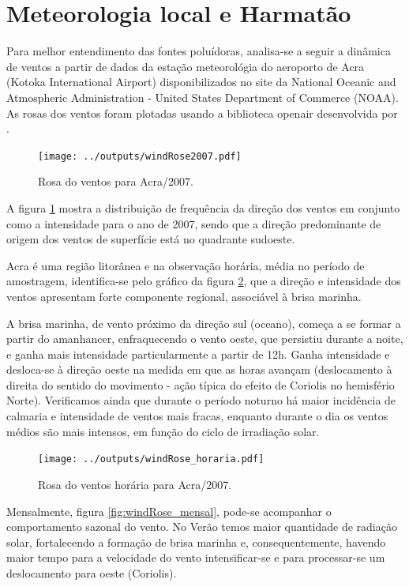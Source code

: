 \newpage
\section{Meteorologia local e Harmatão}

Para melhor entendimento das fontes poluídoras, analisa-se a seguir a 
dinâmica de ventos a partir de dados da estação meteorológia do 
aeroporto de Acra (Kotoka International Airport) disponibilizados no site da 
National Oceanic and Atmospheric Administration - United States Department of 
Commerce (NOAA). As rosas dos ventos foram plotadas usando a biblioteca 
openair desenvolvida por \citet{carslaw2012}.

\begin{figure}[H]
  \centering
  \texttt{[image: ../outputs/windRose2007.pdf]}
  \caption{Rosa do ventos para Acra/2007. \label{fg:rosaCompleta}}
\end{figure}

A figura \ref{fg:rosaCompleta} mostra a distribuição de frequência da direção 
dos ventos em conjunto como a intensidade para o ano de 2007, sendo que a direção 
predominante de origem dos ventos de superfície está no quadrante sudoeste.

Acra é uma região litorânea e na observação horária, média no período de 
amostragem, identifica-se pelo gráfico da figura \ref{fig:windRose_horaria}, 
que a direção e intensidade dos ventos apresentam forte componente regional, 
associável à brisa marinha.

A brisa marinha, de vento próximo da direção sul (oceano), começa a se formar a 
partir do amanhancer, enfraquecendo o vento oeste, que persistiu durante a noite,
e ganha mais intensidade particularmente a partir de 12h. Ganha intensidade e 
desloca-se à direção oeste na medida em que as horas avançam 
(deslocamento à direita do sentido do movimento - ação típica do efeito de 
Coriolis no hemisfério Norte). 
Verificamos ainda que durante o período noturno há maior incidência de calmaria
e intensidade de ventos mais fracas, enquanto durante o dia os ventos médios são
mais intensos, em função do ciclo de irradiação solar.

\begin{figure}[H]
  \centering
  \texttt{[image: ../outputs/windRose\_horaria.pdf]}
  \caption{Rosa do ventos horária para Acra/2007. \label{fig:windRose_horaria}}
\end{figure}

Mensalmente, figura \ref{fig:windRose_mensal}, pode-se acompanhar o 
comportamento sazonal do vento. No Verão temos maior quantidade de radiação 
solar, fortalecendo a formação de brisa marinha e, consequentemente, havendo 
maior tempo para a velocidade do vento intensificar-se e para processar-se um 
deslocamento para oeste (Coriolis). 

